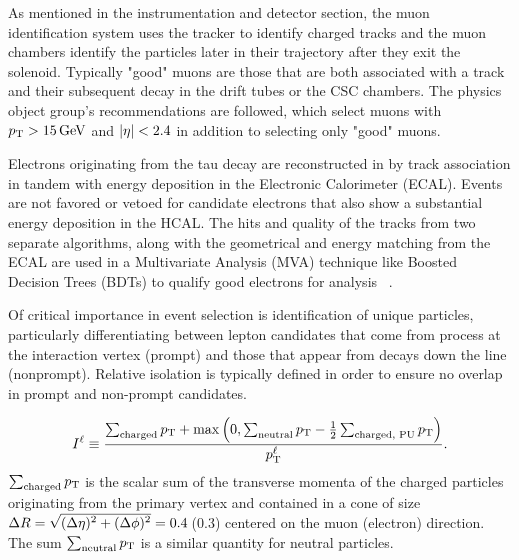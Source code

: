 
As mentioned in the instrumentation and detector section, the muon identification system uses the tracker to identify charged tracks and the muon chambers identify the particles later in their trajectory after they exit the solenoid. Typically "good" muons are those that are both associated with a track and their subsequent decay in the drift tubes or the CSC chambers. The physics object group's recommendations are followed, which select muons with $p_{\mathrm{T}}>15\,\text{Ge\hspace{-.08em}V}$ and $\lvert \eta \rvert<2.4$ in addition to selecting only "good" muons.



Electrons originating from the tau decay are reconstructed in by track association in tandem with energy deposition in the Electronic Calorimeter (ECAL). Events are not favored or vetoed for candidate electrons that also show a substantial energy deposition in the HCAL. The hits and quality of the tracks from two separate algorithms, along with the geometrical and energy matching from the ECAL are used in a Multivariate Analysis (MVA) technique like Boosted Decision Trees (BDTs) to qualify good electrons for analysis 
~\cite{Khachatryan:2015hwa}.


Of critical importance in event selection is identification of unique particles, particularly differentiating between lepton candidates that come from process at the interaction vertex (prompt) and those that appear from decays down the line (nonprompt). Relative isolation is typically defined in order to ensure no overlap in prompt and non-prompt candidates. 

\begin{equation}
I^{\ell} \equiv \frac{\sum_\text{charged}  p_{\mathrm{T}} + \max\left( 0, \sum_\text{neutral}  p_{\mathrm{T}}
                                         - \frac{1}{2} \sum_\text{charged, PU} p_{\mathrm{T}}  \right )}{p_{\mathrm{T}}^{\ell}}.
\label{eq:reconstruction_isolation}
\end{equation}
$\sum_\text{charged}  p_{\mathrm{T}}$ is the scalar sum of the
transverse momenta of the charged particles originating from
the primary vertex and contained in a cone of size
$\Delta R = \sqrt{\smash[b]{(\Delta \eta)^2 + (\Delta \phi)^2}} = 0.4$\,(0.3)
centered on the muon (electron) direction. The sum $\sum_\text{neutral}  p_{\mathrm{T}}$ is
a similar quantity for neutral particles.

